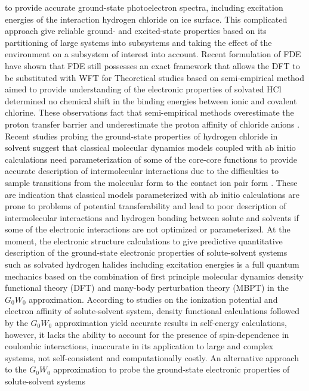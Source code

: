 \documentclass[a4paper,11pt]{report}
\begin{document}
to provide accurate ground-state photoelectron spectra, including excitation energies of the interaction hydrogen chloride on ice surface. This complicated approach give reliable ground- and excited-state properties based on its partitioning of large systems into subsystems and
taking the effect of the environment on a subsystem of interest into account. Recent formulation of FDE have shown that FDE still possesses an exact framework that allows the DFT to be substituted with WFT for Theoretical studies based on semi-empirical method aimed to provide understanding of the electronic properties of solvated HCl  
determined no chemical shift in the binding energies between ionic and covalent chlorine. These observations 
fact that semi-empirical methods overestimate the proton transfer barrier and underestimate the proton affinity of chloride anions
\citep{arillo2007can}. Recent studies probing the ground-state properties of hydrogen chloride in solvent suggest that classical
molecular dynamics models coupled with ab initio calculations need parameterization of some of the core-core functions to provide accurate
description of intermolecular interactions due to the  difficulties to sample transitions from the molecular form to the contact ion pair 
form \citep{wick2017comparison}. These are indication that classical models parameterized with ab initio calculations  
are prone to problems of potential transferability and lead to poor description of intermolecular interactions and hydrogen bonding 
between solute and solvents if some of the electronic interactions are not optimized or parameterized. 
At the moment, the electronic structure calculations to give predictive quantitative description of the ground-state electronic properties of
solute-solvent systems such as solvated  hydrogen halides including excitation energies is a full quantum mechanics 
based on the combination of first principle molecular dynamics density functional theory (DFT) and many-body perturbation theory (MBPT) in the
$G_{0}W_{0}$ approximation. According to studies on the ionization potential and electron affinity of solute-solvent system, density functional 
calculations followed by the $G_{0}W_{0}$ approximation \citep{gaiduk2018electron,pham2017electronic,opalka2014ionization} yield accurate 
results in self-energy calculations, however, it lacks the ability to account for the presence of spin-dependence in coulombic interactions,
inaccurate in its application to large and complex systems, not self-consistent \citep{aryasetiawan1998gw} and computationally costly.
An alternative approach to the $G_{0}W_{0}$ approximation to probe the ground-state electronic properties of solute-solvent systems
\end{document}
